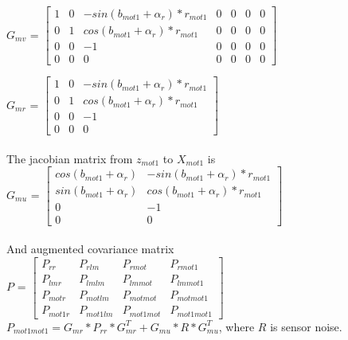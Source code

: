 \documentclass[11pt,a4paper]{article}
\begin{document}
\noindent $G_{mv}$ = $  \begin{bmatrix} 1 & 0 & - sin(b_{mot1}+\alpha_{r})*r_{mot1} & 0 & 0 & 0 & 0\\
                             0 & 1 &  cos(b_{mot1}+\alpha_{r})*r_{mot1}  & 0 & 0 & 0 & 0 \\
							0 & 0 & -1 &  0 & 0 & 0 & 0 \\
							0 & 0  & 0 & 0 &  0 & 0 & 0	                             
                             \end{bmatrix}$

                       
\noindent $G_{mr}$ = $  \begin{bmatrix} 1 & 0 & - sin(b_{mot1}+\alpha_{r})*r_{mot1}\\
                             0 & 1 &  cos(b_{mot1}+\alpha_{r})*r_{mot1} \\
                             0 & 0 & -1 \\
                             0 & 0  & 0 \end{bmatrix}$
\\
\\
\noindent The jacobian matrix from $z_{mot1}$ to $X_{mot1}$ is \\
$G_{mu}$ = $  \begin{bmatrix}  cos(b_{mot1}+\alpha_{r})    & - sin(b_{mot1}+\alpha_{r})*r_{mot1}  \\
                               sin(b_{mot1}+\alpha_{r})  &  cos(b_{mot1}+\alpha_{r})*r_{mot1}   \\
                               0   & -1  \\
                               0  &  0   \end{bmatrix}$
\\
\\
\noindent And augmented covariance matrix\\
 $P$ = $\begin{bmatrix} P_{rr} & P_{rlm} & P_{rmot} & P_{rmot1}\\
										   P_{lmr}& P_{lmlm} & P_{lmmot} & P_{lmmot1}\\
										   P_{motr}& P_{motlm} & P_{motmot} & P_{motmot1}\\ 
										   P_{mot1r}& P_{mot1lm} & P_{mot1mot} & P_{mot1mot1}\end{bmatrix}$  \\                               
$P_{mot1mot1} = G_{mr}*P_{rr}*G_{mr}^{T} + G_{mu}*R*G_{mu}^{T}$, where $R$ is sensor noise.\\
\end{document}
